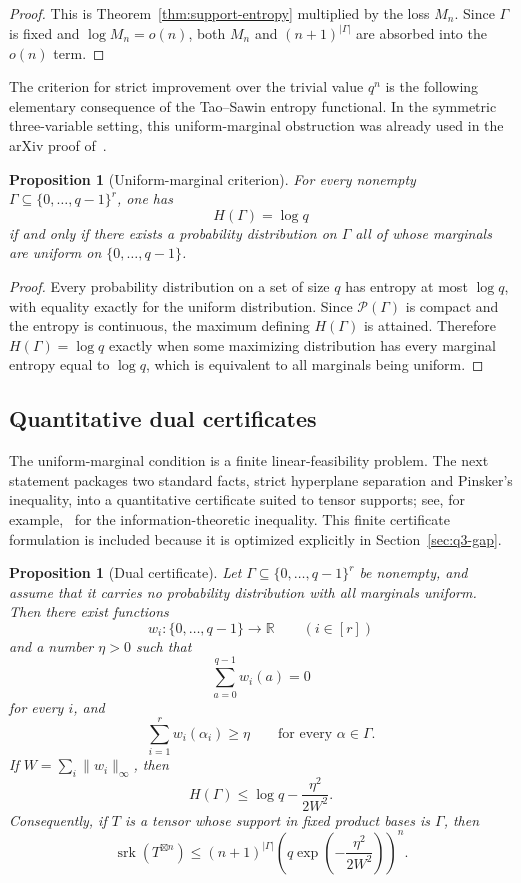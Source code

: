 \documentclass[10pt,a4paper]{amsart}
\newtheorem{proposition}[theorem]{Proposition}
\theoremstyle{definition}
\newcommand{\srk}{\operatorname{srk}}
\newcommand{\boxt}{\boxtimes}
\newcommand{\1}{\mathbf 1}
\begin{document}
\begin{proof}
This is Theorem~\ref{thm:support-entropy} multiplied by the loss $M_n$.  Since $\Gamma$ is fixed and $\log M_n=o(n)$, both $M_n$ and $(n+1)^{|\Gamma|}$ are absorbed into the $o(n)$ term.
\end{proof}

The criterion for strict improvement over the trivial value $q^n$ is the following elementary consequence of the Tao--Sawin entropy functional.  In the symmetric three-variable setting, this uniform-marginal obstruction was already used in the arXiv proof of~\cite[Theorem~4.10]{CostaDellaFiore}.

\begin{proposition}[Uniform-marginal criterion]\label{prop:uniform-marginals}
For every nonempty $\Gamma\subseteq\{0,\ldots,q-1\}^r$, one has
\[
 H(\Gamma)=\log q
\]
if and only if there exists a probability distribution on $\Gamma$ all of whose marginals are uniform on $\{0,\ldots,q-1\}$.
\end{proposition}

\begin{proof}
Every probability distribution on a set of size $q$ has entropy at most $\log q$, with equality exactly for the uniform distribution.  Since $\mathcal P(\Gamma)$ is compact and the entropy is continuous, the maximum defining $H(\Gamma)$ is attained.  Therefore $H(\Gamma)=\log q$ exactly when some maximizing distribution has every marginal entropy equal to $\log q$, which is equivalent to all marginals being uniform.
\end{proof}



\subsection{Quantitative dual certificates}

The uniform-marginal condition is a finite linear-feasibility problem.  The next statement packages two standard facts, strict hyperplane separation and Pinsker's inequality, into a quantitative certificate suited to tensor supports; see, for example,~\cite{CoverThomas} for the information-theoretic inequality.  This finite certificate formulation is included because it is optimized explicitly in Section~\ref{sec:q3-gap}.

\begin{proposition}[Dual certificate]\label{prop:dual}
Let $\Gamma\subseteq\{0,\ldots,q-1\}^r$ be nonempty, and assume that it carries no probability distribution with all marginals uniform.  Then there exist functions
\[
 w_i:\{0,\ldots,q-1\}\longrightarrow\mathbb R\qquad(i\in[r])
\]
and a number $\eta>0$ such that
\[
 \sum_{a=0}^{q-1}w_i(a)=0
\]
for every $i$, and
\[
 \sum_{i=1}^r w_i(\alpha_i)\ge\eta
 \qquad\text{for every }\alpha\in\Gamma.
\]
If $W=\sum_i\lVert w_i\rVert_\infty$, then
\[
 H(\Gamma)\le\log q-\frac{\eta^2}{2W^2}.
\]
Consequently, if $T$ is a tensor whose support in fixed product bases is $\Gamma$, then
\[
 \srk(T^{\boxt n})
 \le (n+1)^{|\Gamma|}
 \left(q\exp\left(-\frac{\eta^2}{2W^2}\right)\right)^n.
\]
\end{proposition}
\end{document}
